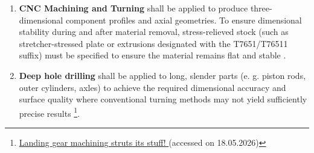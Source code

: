 

\begin{enumerate}
    \item \textbf{CNC Machining and Turning} shall be applied to produce three-dimensional component profiles and axial geometries. To ensure dimensional stability during and after material removal, stress-relieved stock (such as stretcher-stressed plate or extrusions designated with the T7651/T76511 suffix) must be specified to ensure the material remains flat and stable \cite{Younger2007OvercomingResidual}.
    

    \item \textbf{Deep hole drilling} shall be applied to long, slender parts (e. g. piston rods, outer cylinders, axles) to achieve the required dimensional accuracy and surface quality where conventional turning methods may not yield sufficiently precise results \footnote{\href{https://www.aero-mag.com/unisig-b700-landing-gear-drilling-alta-precision}{Landing gear machining struts its stuff! } (accessed on 18.05.2026)}.
    

\end{enumerate}
